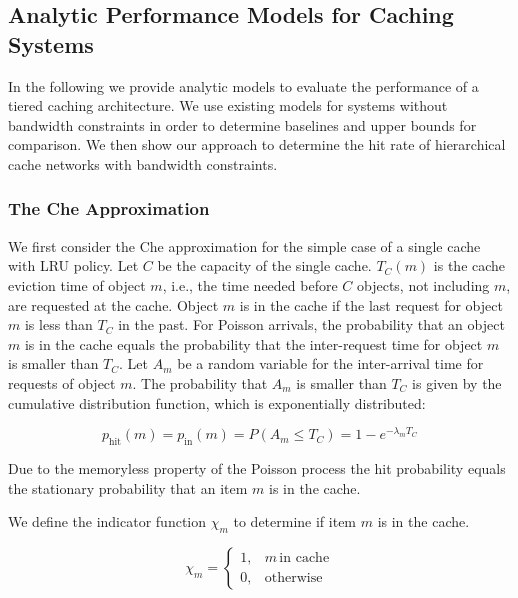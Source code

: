 \subsection{Analytic Performance Models for Caching Systems}

In the following we provide analytic models to evaluate the performance of a tiered caching architecture.
We use existing models for systems without bandwidth constraints in order to determine baselines and upper bounds for comparison.
We then show our approach to determine the hit rate of hierarchical cache networks with bandwidth constraints.

\subsubsection{The Che Approximation}

We first consider the Che approximation \cite{che2002hierarchical} for the simple case of a single cache with LRU policy.
Let $C$ be the capacity of the single cache.
$T_C(m)$ is the cache eviction time of object $m$, i.e., the time needed before $C$ objects, not including $m$, are requested at the cache.
Object $m$ is in the cache if the last request for object $m$ is less than $T_C$ in the past.
For Poisson arrivals, the probability that an object $m$ is in the cache equals the probability that the inter-request time for object $m$ is smaller than $T_C$.
Let $A_m$ be a random variable for the inter-arrival time for requests of object $m$.
The probability that $A_m$ is smaller than $T_C$ is given by the cumulative distribution function, which is exponentially distributed:

\begin{equation}
	p_\text{hit}(m) = p_\text{in}(m) = P(A_m \leq T_C) = 1-e^{-\lambda_m T_C}
\end{equation}

Due to the memoryless property of the Poisson process the hit probability equals the stationary probability that an item $m$ is in the cache.

We define the indicator function $\chi_m$ to determine if item $m$ is in the cache.

\begin{equation}
\chi_m =
	\begin{cases}
		1, & m \, \text{in cache} \\
      		0, & \text{otherwise}
	\end{cases}
\end{equation}

